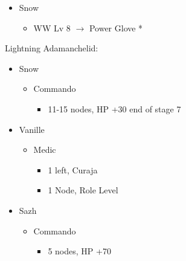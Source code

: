\begin{multicols}{2}
\begin{menu}
\begin{itemize}
\begin{itemize}
\begin{itemize}
\begin{itemize}
					            \end{itemize}
				      \end{itemize}
			\end{itemize}
			\equip
			\begin{itemize}
				\item Snow
				      \begin{itemize}
					      \item WW Lv 8 $\rightarrow$ Power Glove *
				      \end{itemize}
			\end{itemize}
		\end{itemize}
	\end{menu}
	
	\columnbreak
	\begin{center}
		Lightning Adamanchelid:
	\end{center}
	\begin{menu}
		\begin{itemize}
			\crystarium
			\begin{itemize}
				\item Snow
				      \begin{itemize}
					      \item Commando
					            \begin{itemize}
						            \item 11-15 nodes, HP +30 end of stage 7
					            \end{itemize}
				      \end{itemize}
				\item Vanille
				      \begin{itemize}
					      \item Medic
					            \begin{itemize}
						            \item 1 left, Curaja
						            \item 1 Node, Role Level
					            \end{itemize}
				      \end{itemize}
				\item Sazh
				      \begin{itemize}
					      \item Commando
					            \begin{itemize}
						            \item 5 nodes, HP +70
					            \end{itemize}
				      \end{itemize}

\end{itemize}
\end{itemize}
\end{menu}
\end{multicols}
